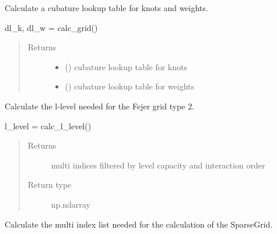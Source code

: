 \documentclass[letterpaper,10pt,english,openany,oneside]{sphinxmanual}
\begin{document}
\begin{fulllineitems}
\begin{fulllineitems}
\label{\detokenize{pygpc:pygpc.grid.SparseGrid.calc_grid}}
Calculate a cubature lookup table for knots and weights.

dl\_k, dl\_w = calc\_grid()
\begin{quote}\begin{description}
\item[{Returns}] \leavevmode
\begin{itemize}
\item {} 
 () \textendash{} cubature lookup table for knots

\item {} 
 () \textendash{} cubature lookup table for weights

\end{itemize}


\end{description}\end{quote}

\end{fulllineitems}


\begin{fulllineitems}
\label{\detokenize{pygpc:pygpc.grid.SparseGrid.calc_l_level}}
Calculate the l-level needed for the Fejer grid type 2.

l\_level = calc\_l\_level()
\begin{quote}\begin{description}
\item[{Returns}] \leavevmode
{} \textendash{} multi indices filtered by level capacity and interaction order

\item[{Return type}] \leavevmode
np.ndarray

\end{description}\end{quote}

\end{fulllineitems}


\begin{fulllineitems}
\label{\detokenize{pygpc:pygpc.grid.SparseGrid.calc_multi_index_lst}}
Calculate the multi index list needed for the calculation of the SparseGrid.


\end{fulllineitems}
\end{fulllineitems}
\end{document}
